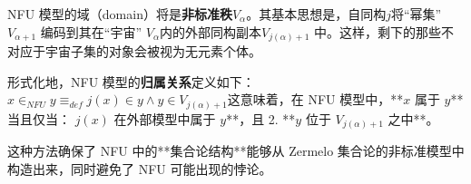 NFU 模型的域（domain）将是\textbf{非标准秩}\( V_{\alpha} \)。其基本思想是，自同构\( j \)将“幂集” \( V_{\alpha+1} \) 编码到其在“宇宙” \( V_{\alpha} \)内的外部同构副本\( V_{j(\alpha)+1} \) 中。这样，剩下的那些不对应于宇宙子集的对象会被视为无元素个体。

形式化地，NFU 模型的\textbf{归属关系}定义如下：\(x \in_{NFU} y \equiv_{def} j(x) \in y \wedge y \in V_{j(\alpha) + 1}\)这意味着，在 NFU 模型中，**\( x \) 属于 \( y \)** 当且仅当：
\( j(x) \) 在外部模型中属于 \( y \)**，且  
2. **\( y \) 位于 \( V_{j(\alpha) + 1} \) 之中**。  

这种方法确保了 NFU 中的**集合论结构**能够从 Zermelo 集合论的非标准模型中构造出来，同时避免了 NFU 可能出现的悖论。